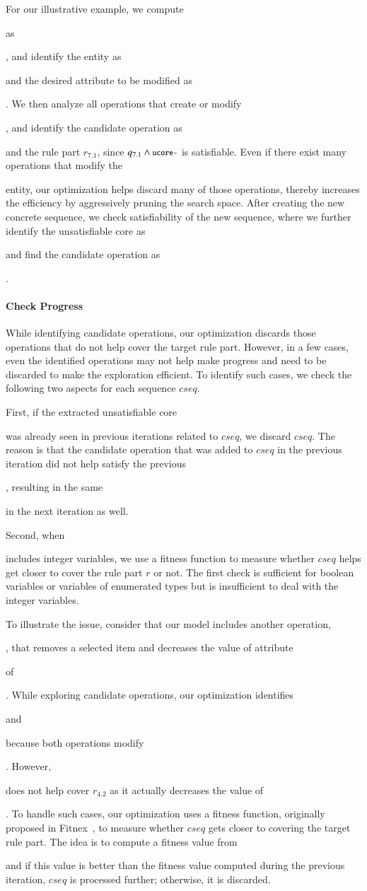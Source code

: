 For our illustrative example, we compute \subject{ucore-} as
\subject{ord.total > 0}, and identify the entity as \subject{Order} and the
desired attribute to be modified as \subject{total}. We then analyze all operations
that create or modify \subject{Order}, and identify the candidate operation
as \subject{AddItemToOrder} and the rule part $r_{7.1}$, since $q_{7.1} \wedge
\subject{ucore-}$ is satisfiable. Even if there exist
many operations that modify the \subject{Order} entity, our optimization
helps discard many of those operations, thereby increases the efficiency
by aggressively pruning the search space. 
After creating the new concrete sequence, we check satisfiability of the new
sequence, where we further identify the unsatisfiable core as
\subject{cust.crLimit = 0 $\wedge$ cust.crLimit > 0} and find the
candidate operation as \subject{AddCreditLimit}.

\vskip -7pt
\paragraph*{Check Progress} While identifying candidate operations, our
optimization discards
those operations that do not help cover the target rule part. However,
in a few cases, even the identified operations may not help make progress and need
to be discarded to make the exploration efficient. To identify such cases, we
check the following two aspects for each sequence $cseq$.

First, if the extracted unsatisfiable core \subject{ucore} was already seen in
previous iterations related to $cseq$, we discard $cseq$. The reason
is that the candidate operation that was added to $cseq$ in the previous
iteration did not help satisfy the previous \subject{ucore}, resulting in the
same \subject{ucore} in the next iteration as well.

Second, when \subject{ucore} includes integer variables, we use a
fitness function to measure whether $cseq$ helps get closer to cover the rule
part $r$ or not. The first check is sufficient for boolean variables or
variables of enumerated types but is insufficient to deal with the integer
variables.

To illustrate the issue, consider that our model includes another operation,
\subject{RemoveItemFromOrder}, that removes a selected item and decreases the
value of attribute \subject{total} of \subject{Order}. While exploring candidate
operations, our optimization identifies \subject{AddItemToOrder} and
\subject{RemoveItemFromOrder} because both operations modify
\subject{total}. However, \subject{RemoveItemFromOrder} does not help cover
$r_{4.2}$ as it actually decreases the value of \subject{total}. To handle such
cases, our optimization uses a fitness function, originally proposed in
Fitnex~\cite{xie09:fitness}, to measure whether $cseq$ gets closer to covering
the target rule part. The idea is to compute a fitness value from
\subject{ucore} and if this value is better than the fitness value computed
during the previous iteration, $cseq$ is processed further; otherwise, it is
discarded.
